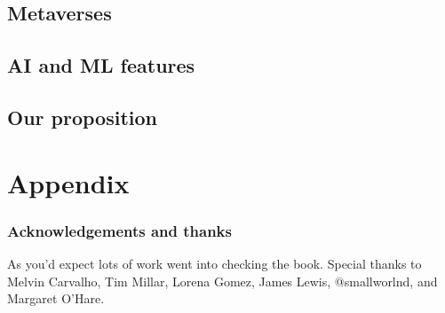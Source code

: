 \documentclass[
	10pt, %
	fleqn, %
	a5paper, %
]{LegrandOrangeBook}
\begin{document}
\chapter{Metaverses}


\chapter{AI and ML features}


\chapter{Our proposition}


%
%
\stopcontents[part] %

\part{Appendix}
\section{Acknowledgements and thanks}
As you'd expect lots of work went into checking the book. Special thanks to Melvin Carvalho, Tim Millar, Lorena Gomez, James Lewis, @smallworlnd, and Margaret O'Hare.
\end{document}
